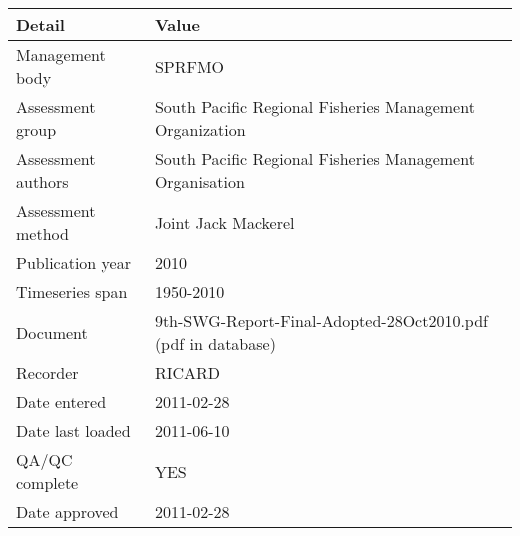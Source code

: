 \begin{table}[htb]
\centering
\begin{tabular}{lp{7cm}}
\toprule
Detail & Value \\
\midrule
Management body    & SPRFMO                                                       \\
Assessment group   & South Pacific Regional Fisheries Management Organization     \\
Assessment authors & South Pacific Regional Fisheries Management Organisation     \\
Assessment method  & Joint Jack Mackerel                                          \\
Publication year   & 2010                                                         \\
Timeseries span    & 1950-2010                                                    \\
Document           & 9th-SWG-Report-Final-Adopted-28Oct2010.pdf (pdf in database) \\
Recorder           & RICARD                                                       \\
Date entered       & 2011-02-28                                                   \\
Date last loaded   & 2011-06-10                                                   \\
QA/QC complete     & YES                                                          \\
Date approved      & 2011-02-28                                                   \\
\bottomrule
\end{tabular}
\label{tab:assessdet}
\end{table}
